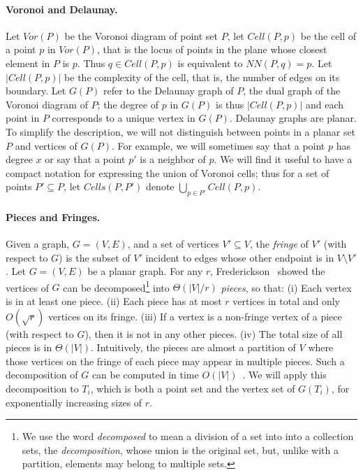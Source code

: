 \documentclass[12pt,a4paper,USenglish,cleveref, autoref, thm-restate]{article}
\newcommand{\Cell}{\mathit{Cell}}
\newcommand{\Cells}{\mathit{Cells}}
\newcommand{\NN}{\mathit{NN}}
\newcommand{\Voron}{\mathit{Vor}}
\newcommand{\Cell}{\mathit{Cell}}
\newcommand{\Cells}{\mathit{Cells}}
\newcommand{\NN}{\mathit{NN}}
\newcommand{\Voron}{\mathit{Vor}}
\newcommand{\Cell}{\mathit{Cell}}
\newcommand{\Cells}{\mathit{Cells}}
\newcommand{\NN}{\mathit{NN}}
\newcommand{\Voron}{\mathit{Vor}}
\begin{document}
\paragraph*{Voronoi and Delaunay.}
Let $\Voron(P)$ be the Voronoi diagram of point set $P$, let $\Cell(P,p)$ be the cell of a point $p$ in $\Voron(P)$, that is the locus of points in the plane whose closest element in $P$ is $p$. Thus $q\in \Cell(P,p)$ is equivalent to $\NN(P,q)=p$.
Let $|\Cell(P,p)|$ be the complexity of the cell, that is, the number of edges on its boundary.
Let $G(P)$ refer to the Delaunay graph of $P$, the dual graph of the Voronoi diagram of $P$; the degree of $p$ in $G(P)$ is thus $|\Cell(P,p)|$ and each point in $P$ corresponds to a unique vertex in $G(P)$.  Delaunay graphs are planar.  To simplify the description, we will not distinguish between points in a planar set $P$ and vertices of $G(P)$. For example, we will sometimes say that a point $p$ has degree $x$ or say that a point $p'$ is a neighbor of $p$. We will find it useful to have a compact notation for expressing the union of Voronoi cells; thus for a set of points $P' \subseteq P$, let $\Cells(P,P')$ denote $ \bigcup_{p \in P'} \Cell(P,p)$.

\paragraph*{Pieces and Fringes.}
Given a graph, $G=(V,E)$, and a set of vertices $V' \subseteq V$, the \emph{fringe} of $V'$ (with respect to $G$) is the subset of $V'$ incident to edges whose other endpoint is in $V \setminus V'$.
Let $G=(V,E)$ be a planar graph. For any $r$, Frederickson~\cite{Frederickson87} showed the vertices of $G$ can be decomposed\footnote{We use the word \emph{decomposed} to mean a division of a set into into a collection sets, the \emph{decomposition}, whose union is the original set, but, unlike with a partition, elements may belong to multiple sets.} into $\Theta(|V|/r)$ \emph{pieces}, so that:  (i) Each vertex is in at least one piece. (ii) Each piece has at most $r$ vertices in total and  only  $O(\sqrt{r})$ vertices on its fringe. (iii) If a vertex is a non-fringe vertex of a piece (with respect to $G$), then it is not in any other pieces. (iv) The total size of all pieces is in $\Theta(|V|)$.   Intuitively, the pieces are almost a partition of $V$ where those vertices on the fringe of each piece may appear in multiple pieces.
Such a decomposition of $G$ can be computed in time $O(|V|)$~\cite{Goodrich95,KleinMS13}. 
We will apply this decomposition to  $T_i$, which is both a point set and the vertex set of $G(T_i)$, for exponentially increasing sizes of $r$.
\end{document}
